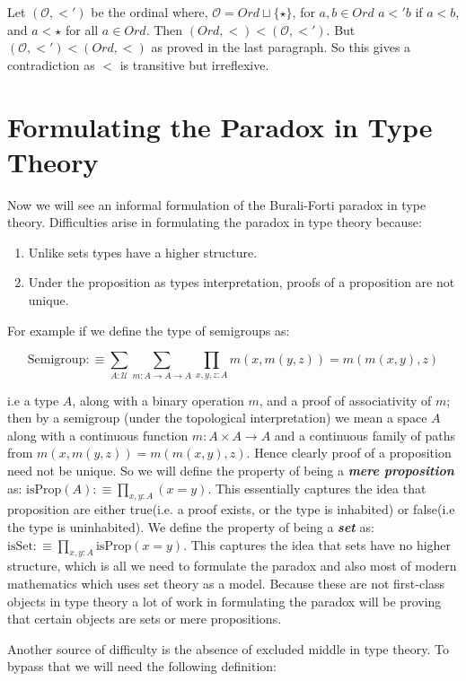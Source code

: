 \documentclass[10pt]{article}
\theoremstyle{definition}
\theoremstyle{plain}
\theoremstyle{remark}
\newcommand{\U}{\mathscr{U}}
\begin{document}
Let $(\mathcal{O}, <')$ be the ordinal where, $\mathcal{O} = Ord\sqcup \{\star\}$, for 
$a,b\in Ord$ $a<'b$ if $a<b$, and $a<\star$ for all $a\in Ord$. Then 
$(Ord,<)< (\mathcal{O},<')$. But $(\mathcal{O},<')<(Ord,<)$ as proved in the last paragraph.
So this gives a contradiction as $<$ is transitive but irreflexive. 

\section{Formulating the Paradox in Type Theory}\label{S:Form in TT}

Now we will see an informal formulation of the Burali-Forti paradox in type theory. 
Difficulties arise in formulating the paradox in type theory because:
\begin{enumerate}
\item Unlike sets types have a higher structure.
\item Under the proposition as types interpretation, proofs of a proposition are not unique.
\end{enumerate}

For example if we define the type of semigroups as:

\[ \text{Semigroup}:\equiv 	\sum_{A : \U} \sum_{m : A \to A \to A} 
    \prod_{x,y,z:A} m(x,m(y,z)) = m(m(x,y),z) \]
    
i.e a type $A$, along with a binary operation $m$, and a proof of associativity of $m$; then
by a semigroup (under the topological interpretation) we mean a space $A$ along with a
continuous function $m : A\times A \to A$ and a continuous family of paths from 
$m(x,m(y,z)) = m(m(x,y),z)$. Hence clearly proof of a proposition need not be unique. So
we will define the property of being a \textbf{\textit{mere proposition}} as:
${ \text{isProp}(A) :\equiv \prod_{x,y : A} (x = y) }$. This essentially captures the idea
that proposition are either true(i.e. a proof exists, or the type is inhabited) or false(i.e
the type is uninhabited). We define the property of being a \textbf{\textit{set}} as: 
${ \text{isSet} :\equiv \prod_{x,y:A} \text{isProp}(x=y)  }$. This captures the idea that sets
have no higher structure, which is all we need to formulate the paradox and also most of
modern mathematics which uses set theory as a model. Because these are not first-class 
objects in type theory a lot of work in formulating the paradox will be proving that certain
objects are sets or mere propositions.\smallskip

Another source of difficulty is the absence of excluded middle in type theory. To bypass that
we will need the following definition:
\end{document}
